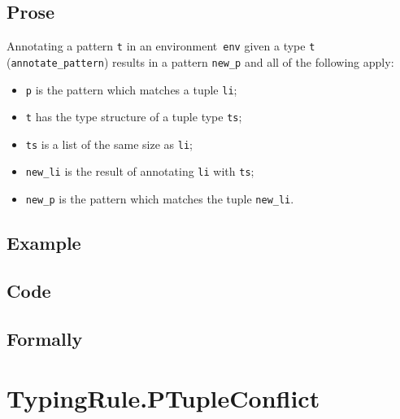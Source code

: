 \documentclass{book}
\begin{document}
  \subsection{Prose}
   Annotating a pattern \texttt{t} in an environment~\texttt{env} given a type \texttt{t} (\texttt{annotate\_pattern}) results in a pattern \texttt{new\_p} and all of the following apply:
   \begin{itemize}
   \item \texttt{p} is the pattern which matches a tuple \texttt{li};
   \item \texttt{t} has the type structure of a tuple type \texttt{ts};
   \item \texttt{ts} is a list of the same size as \texttt{li};  
   \item \texttt{new\_li} is the result of annotating \texttt{li} with \texttt{ts};
   \item \texttt{new\_p} is the pattern which matches the tuple \texttt{new\_li}.
   \end{itemize}

  \subsection{Example}

  \subsection{Code}

\begin{emptyformal}
    \subsection{Formally}
\end{emptyformal}



\section{TypingRule.PTupleConflict \label{sec:TypingRule.PTupleConflict}}
\end{document}
